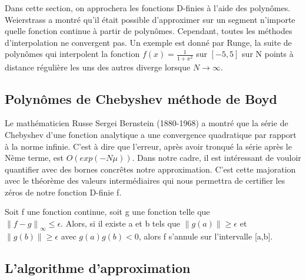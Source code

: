 \documentclass[a4paper,10.5pt]{article}
\begin{document}
	Dans cette section, on approchera les fonctions D-finies à l'aide des polynômes.
	Weierstrass a montré qu'il était possible d'approximer sur un segment n'importe quelle fonction continue à partir de polynômes. Cependant, toutes les méthodes d'interpolation ne convergent pas. Un exemple est donné par Runge, la suite de polynômes qui interpolent la fonction $f(x)=\frac{1}{1+x^{2}}$ sur $[-5,5]$ sur N points à distance régulière les uns des autres diverge lorsque $N \rightarrow \infty$.
	
	\subsection{Polynômes de Chebyshev méthode de Boyd}
	
	
	Le mathématicien Russe Sergei Bernstein (1880-1968) a montré que la série de Chebyshev d'une fonction analytique a une convergence quadratique par rapport à la norme infinie. C'est à dire que l'erreur, après avoir tronqué la série après le Nème terme, est $O(exp(-N\mu))$. Dans notre cadre, il est intéressant de vouloir quantifier avec des bornes concrêtes notre approximation.
	C'est cette majoration avec le théorème des valeurs intermédiaires qui nous permettra de certifier les zéros de notre fonction D-finie f.
	
	
	\begin{proposition}
		Soit f une fonction continue, soit g une fonction telle que \\
		$\left\|f-g \right\|_{\infty} \leq \epsilon$. Alors, si il existe a et b tels que $\left\|g(a)\right\| \geq \epsilon$ et $\left\|g(b)\right\| \geq \epsilon$ avec $g(a)g(b) < 0$, alors f s'annule sur l'intervalle [a,b].
		
	\end{proposition}
	
	\subsection{L'algorithme d'approximation}
	
\end{document}
